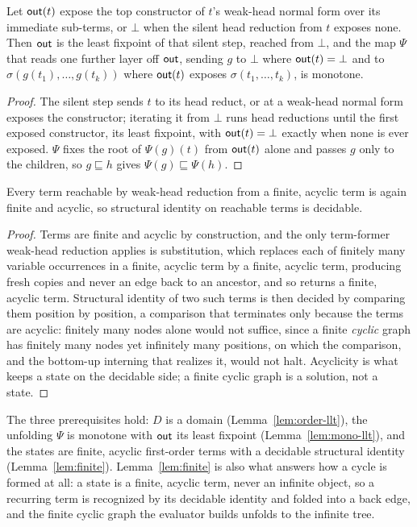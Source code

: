 \begin{lemma}\label{lem:mono-llt}
  Let $\mathsf{out}(t)$ expose the top constructor of $t$'s weak-head normal form over its immediate sub-terms, or $\bot$ when the silent head reduction from $t$ exposes none. Then $\mathsf{out}$ is the least fixpoint of that silent step, reached from $\bot$, and the map $\Psi$ that reads one further layer off $\mathsf{out}$, sending $g$ to $\bot$ where $\mathsf{out}(t) = \bot$ and to $\sigma(g(t_1), \dots, g(t_k))$ where $\mathsf{out}(t)$ exposes $\sigma(t_1, \dots, t_k)$, is monotone.
\end{lemma}
\begin{proof}
  The silent step sends $t$ to its head reduct, or at a weak-head normal form exposes the constructor; iterating it from $\bot$ runs head reductions until the first exposed constructor, its least fixpoint, with $\mathsf{out}(t) = \bot$ exactly when none is ever exposed. $\Psi$ fixes the root of $\Psi(g)(t)$ from $\mathsf{out}(t)$ alone and passes $g$ only to the children, so $g \sqsubseteq h$ gives $\Psi(g) \sqsubseteq \Psi(h)$.
\end{proof}

\begin{lemma}\label{lem:finite}
  Every term reachable by weak-head reduction from a finite, acyclic term is again finite and acyclic, so structural identity on reachable terms is decidable.
\end{lemma}
\begin{proof}
  Terms are finite and acyclic by construction, and the only term-former weak-head reduction applies is substitution, which replaces each of finitely many variable occurrences in a finite, acyclic term by a finite, acyclic term, producing fresh copies and never an edge back to an ancestor, and so returns a finite, acyclic term. Structural identity of two such terms is then decided by comparing them position by position, a comparison that terminates only because the terms are acyclic: finitely many nodes alone would not suffice, since a finite \emph{cyclic} graph has finitely many nodes yet infinitely many positions, on which the comparison, and the bottom-up interning that realizes it, would not halt. Acyclicity is what keeps a state on the decidable side; a finite cyclic graph is a solution, not a state.
\end{proof}

\noindent
The three prerequisites hold: $D$ is a domain (Lemma~\ref{lem:order-llt}), the unfolding $\Psi$ is monotone with $\mathsf{out}$ its least fixpoint (Lemma~\ref{lem:mono-llt}), and the states are finite, acyclic first-order terms with a decidable structural identity (Lemma~\ref{lem:finite}). Lemma~\ref{lem:finite} is also what answers how a cycle is formed at all: a state is a finite, acyclic term, never an infinite object, so a recurring term is recognized by its decidable identity and folded into a back edge, and the finite cyclic graph the evaluator builds unfolds to the infinite tree.

